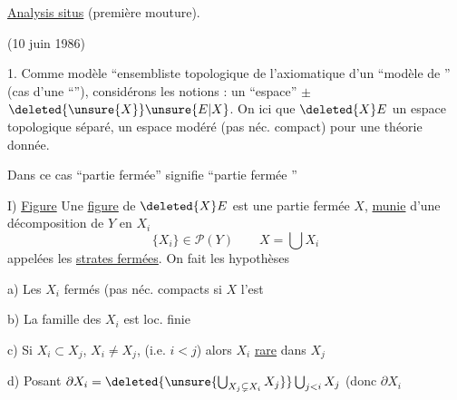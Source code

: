 \uline{Analysis situs} (première mouture).

(10 juin 1986)

1. Comme modèle ``ensembliste topologique de l'axiomatique d'un ``modèle de  '' (cas d'une ``\uline{}''),
considérons les notions   : un ``espace'' $\pm$  $\deleted{\unsure{X}}\unsure{E|X}$.
On  ici que $\deleted{X}E$  un espace topologique séparé,  un espace modéré (pas néc. compact) pour une théorie  donnée.

Dans ce cas ``partie fermée'' signifie ``partie fermée ''

I) \uline{Figure} \qquad Une \uline{figure}  de $\deleted{X}E$ est une partie fermée $X$, \uline{munie} d'une
décomposition de $Y$ en   $X_i$
\[
\{X_i\}\in\mathcal{P}(Y) \qquad X=\bigcup X_i
\]
appelées les \uline{strates fermées}. On fait les hypothèses

a) Les $X_i$ fermés  (pas néc. compacts \unsure{\}}   si $X$ l'est\unsure{)}

b) La famille des $X_i$ est loc. finie

c) Si   $X_i\subset X_j$, $X_i\ne X_j$, (i.e. $i<j$) alors $X_i$ \uline{rare} dans $X_j$

d) Posant $\partial X_i=\deleted{\unsure{\bigcup_{X_j\subsetneq X_i}X_j}}\bigcup_{j<i}X_j$ (donc $\partial X_i$

